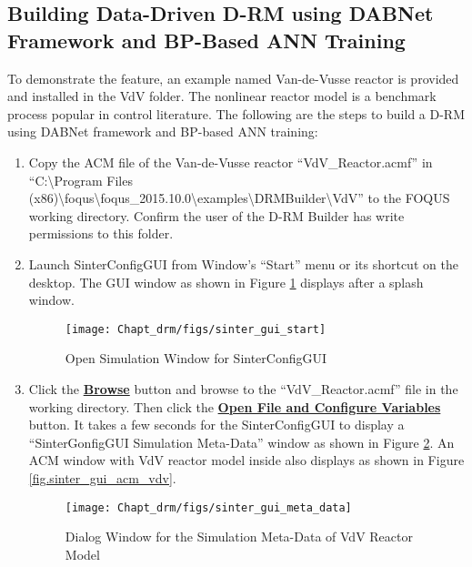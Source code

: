 \subsection{Building Data-Driven D-RM using DABNet Framework and BP-Based ANN Training}
To demonstrate the feature, an example named Van-de-Vusse reactor is provided and installed in the VdV folder.  The nonlinear reactor model is a benchmark process popular in control literature.  The following are the steps to build a D-RM using DABNet framework and BP-based ANN training:
\begin{enumerate}
	\item Copy the ACM file of the Van-de-Vusse reactor ``VdV\_Reactor.acmf'' in ``C:\textbackslash Program Files (x86)\textbackslash foqus\textbackslash foqus\_2015.10.0\textbackslash examples\textbackslash DRMBuilder\textbackslash VdV'' to the FOQUS working directory.  Confirm the user of the D-RM Builder has write permissions to this folder.
	\item Launch SinterConfigGUI from Window$\text{'}$s ``Start'' menu or its shortcut on the desktop.  The GUI window as shown in Figure \ref{fig.sinter_gui_start} displays after a splash window.
	\begin{figure}[H]
		\begin{center}
			\texttt{[image: Chapt\_drm/figs/sinter\_gui\_start]}
			\caption{Open Simulation Window for SinterConfigGUI}
			\label{fig.sinter_gui_start}
		\end{center}
	\end{figure}
	\item Click the \textbf{\underline{Browse}} button and browse to the ``VdV\_Reactor.acmf'' file in the working directory.  Then click the \textbf{\underline{Open File and Configure Variables}} button.  It takes a few seconds for the SinterConfigGUI to display a ``SinterGonfigGUI Simulation Meta-Data'' window as shown in Figure \ref{fig.sinter_gui_meta_data}.  An ACM window with VdV reactor model inside also displays as shown in Figure \ref{fig.sinter_gui_acm_vdv}.
	\begin{figure}[H]
		\begin{center}
			\texttt{[image: Chapt\_drm/figs/sinter\_gui\_meta\_data]}
			\caption{Dialog Window for the Simulation Meta-Data of VdV Reactor Model}
			\label{fig.sinter_gui_meta_data}
		\end{center}
	\end{figure}
	\begin{figure}[H]
		\begin{center}

\end{center}
\end{figure}
\end{enumerate}
